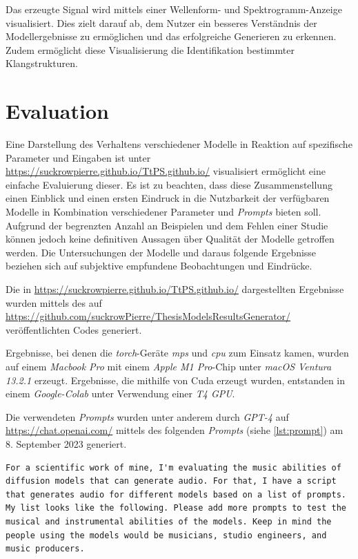 \documentclass[
  a4paper,  %
  twoside,  %
  bibliography=totoc,
  headsepline,
  cleardoublepage=empty,
  parskip=half,
  draft=false
]{scrbook}
\begin{document}
{Das erzeugte Signal wird mittels einer Wellenform- und Spektrogramm-Anzeige visualisiert. Dies zielt darauf ab, dem Nutzer ein besseres Verständnis der Modellergebnisse zu ermöglichen und das erfolgreiche Generieren zu erkennen. Zudem ermöglicht diese Visualisierung die Identifikation bestimmter Klangstrukturen.


\section{Evaluation}

Eine Darstellung des Verhaltens verschiedener Modelle in Reaktion auf spezifische Parameter und Eingaben ist unter \url{https://suckrowpierre.github.io/TtPS.github.io/} \cite{pierre-louis_suckrow_text-zu-spielbarem-klang_nodate} visualisiert ermöglicht eine einfache Evaluierung dieser. Es ist zu beachten, dass diese Zusammenstellung einen Einblick und einen ersten Eindruck in die Nutzbarkeit der verfügbaren Modelle in Kombination verschiedener Parameter und \emph{Prompts} bieten soll. Aufgrund der begrenzten Anzahl an Beispielen und dem Fehlen einer Studie können jedoch keine definitiven Aussagen über Qualität der Modelle getroffen werden. Die Untersuchungen der Modelle und daraus folgende Ergebnisse beziehen sich auf subjektive empfundene Beobachtungen und Eindrücke.  

Die in \url{https://suckrowpierre.github.io/TtPS.github.io/} \cite{pierre-louis_suckrow_text-zu-spielbarem-klang_nodate} dargestellten Ergebnisse wurden mittels des auf \url{https://github.com/suckrowPierre/ThesisModelsResultsGenerator/} veröffentlichten Codes generiert.

Ergebnisse, bei denen die \emph{torch}-Geräte \emph{mps} und \emph{cpu} zum Einsatz kamen, wurden auf einem \emph{Macbook Pro} mit einem \emph{Apple M1 Pro}-Chip unter \emph{macOS Ventura 13.2.1} erzeugt. Ergebnisse, die mithilfe von Cuda erzeugt wurden, entstanden in einem \emph{Google-Colab} unter Verwendung einer \emph{T4 GPU}.

Die verwendeten \emph{Prompts} wurden unter anderem durch \emph{GPT-4} \cite{openai_gpt-4_2023} auf \url{https://chat.openai.com/} mittels des folgenden \emph{Prompts} (siehe \ref{lst:prompt}) am 8. September 2023 generiert.

\begin{Listing}
\begin{lstlisting}[style=gpt]
For a scientific work of mine, I'm evaluating the music abilities of diffusion models that can generate audio. For that, I have a script that generates audio for different models based on a list of prompts. My list looks like the following. Please add more prompts to test the musical and instrumental abilities of the models. Keep in mind the people using the models would be musicians, studio engineers, and music producers. 



\end{lstlisting}
\end{Listing}}
\end{document}
